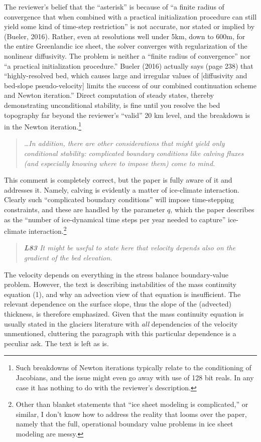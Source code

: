 \documentclass[letterpaper,final,12pt,reqno]{amsart}
\newenvironment{review}%
{\bigskip \par \begin{quote} \selectfont \sl}%
{\end{quote}}
\begin{document}
The reviewer's belief that the ``asterisk'' is because of ``a finite radius of convergence that when combined with a practical initialization procedure can still yield some kind of time-step restriction'' is not accurate, nor stated or implied by (Bueler, 2016).  Rather, even at resolutions well under 5km, down to 600m, for the entire Greenlandic ice sheet, the solver converges with regularization of the nonlinear diffusivity.  The problem is neither a ``finite radius of convergence'' nor ``a practical initialization procedure.''  Bueler (2016) actually says (page 238) that ``highly-resolved bed, which causes large and irregular values of [diffusivity and bed-slope pseudo-velocity] limits the success of our combined continuation scheme and Newton iteration.''  Direct computation of steady states, thereby demonstrating unconditional stability, is fine until you resolve the bed topography far beyond the reviewer's ``valid'' 20 km level, and the breakdown is in the Newton iteration.\footnote{Such breakdowns of Newton iterations typically relate to the conditioning of Jacobians, and the issue might even go away with use of 128 bit reals.  In any case it has nothing to do with the reviewer's description.}

\begin{review}
\dots In addition, there are other considerations that might yield only conditional stability: complicated boundary conditions like calving fluxes (and especially knowing where to impose them) come to mind.
\end{review}

\noindent This comment is completely correct, but the paper is fully aware of it and addresses it.  Namely, calving is evidently a matter of ice-climate interaction.  Clearly such ``complicated boundary conditions'' will impose time-stepping constraints, and these are handled by the parameter $q$, which the paper describes as the ``number of ice-dynamical time steps per year needed to capture'' ice-climate interaction.\footnote{Other than blanket statements that ``ice sheet modeling is complicated,'' or similar, I don't know how to address the reality that looms over the paper, namely that the full, operational boundary value problems in ice sheet modeling are messy.}

\begin{review}
\textbf{L83} It might be useful to state here that velocity depends also on the gradient of the bed elevation.
\end{review}

\noindent The velocity depends on everything in the stress balance boundary-value problem.  However, the text is describing instabilities of the mass continuity equation (1), and why an advection view of that equation is insufficient.  The relevant dependence on the surface slope, thus the slope of the (advected) thickness, is therefore emphasized.  Given that the mass continuity equation is usually stated in the glaciers literature with \emph{all} dependencies of the velocity unmentioned, cluttering the paragraph with this particular dependence is a peculiar ask.  The text is left as is.
\end{document}
